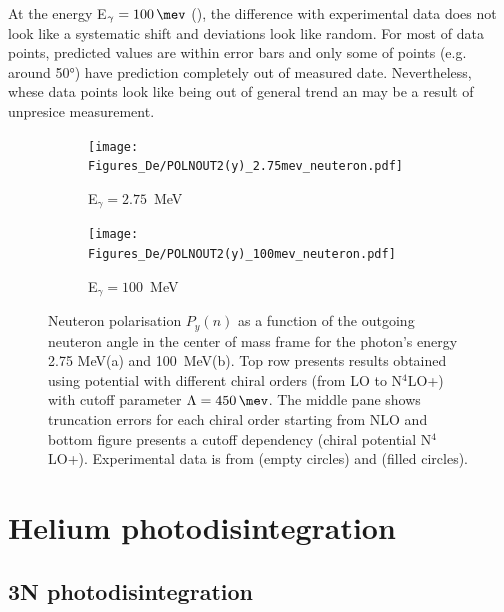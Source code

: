     At the energy E$_\gamma = \SI{100}{\mev}$ (), the difference with experimental
    data does not look like a systematic shift and deviations look like random.
    For most of data points, predicted values are within error bars and only some
    of points (e.g. around \ang{50}) have prediction completely out of measured date.
    Nevertheless, whese data points look like being out of general trend an may be
    a result of unpresice measurement.


    \begin{figure}[h]
        \centering
        \begin{subfigure}[b]{0.46\textwidth}
            \texttt{[image: Figures\_De/POLNOUT2(y)\_2.75mev\_neuteron.pdf]}
            \caption{\small E$_\gamma = 2.75$~MeV}
            \label{Pn_2p75_vert}
        \end{subfigure}
        \begin{subfigure}[b]{0.46\textwidth}
            \texttt{[image: Figures\_De/POLNOUT2(y)\_100mev\_neuteron.pdf]}
            \caption{\small E$_\gamma = 100$~MeV}
            \label{Pn_100_vert}
        \end{subfigure}
        \caption{Neuteron polarisation $P_y(n)$ 
        as a function of the outgoing neuteron angle in the center of mass frame 
        for the photon's energy 2.75 MeV(a) and 100~MeV(b).
        Top row presents results obtained using potential
        with different chiral orders (from LO to N$^4$LO+) with cutoff parameter $\Lambda=\SI{450}{\mev}$.
        The middle pane shows truncation errors for each 
        chiral order starting from NLO and
        bottom figure presents a cutoff dependency (chiral potential N$^4$LO+).
        Experimental data is from \cite{Jewell_neuteronpolarization} (empty circles)
        and \cite{CAMERON_neuteronpolarization} (filled circles).}
        \label{Pn_2p75_100}
    \end{figure}


\clearpage

\section{Helium photodisintegration}

\subsection{3N photodisintegration}

